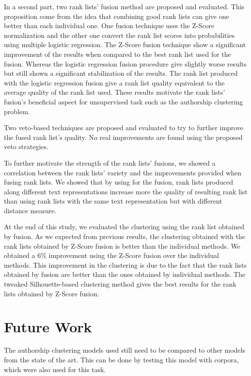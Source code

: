 In a second part, two rank lists' fusion method are proposed and evaluated.
This proposition come from the idea that combining good rank lists can give one better than each individual one.
One fusion technique uses the Z-Score normalization and the other one convert the rank list scores into probabilities using multiple logistic regression.
The Z-Score fusion technique show a significant improvement of the results when compared to the best rank list used for the fusion.
Whereas the logistic regression fusion procedure give slightly worse results but still shown a significant stabilization of the results.
The rank list produced with the logistic regression fusion give a rank list quality equivalent to the average quality of the rank list used.
These results motivate the rank lists' fusion's beneficial aspect for unsupervised task such as the authorship clustering problem.

Two veto-based techniques are proposed and evaluated to try to further improve the fused rank list's quality.
No real improvements are found using the proposed veto strategies.

To further motivate the strength of the rank lists' fusions, we showed a correlation between the rank lists' variety and the improvements provided when fusing rank lists.
We showed that by using for the fusion, rank lists produced along different text representations increase more the quality of resulting rank list than using rank lists with the same text representation but with different distance measure.

At the end of this study, we evaluated the clustering using the rank list obtained by fusion.
As we expected from previous results, the clustering obtained with the rank lists obtained by Z-Score fusion is better than the individual methods.
We obtained a 6\% improvement using the Z-Score fusion over the individual methods.
This improvement in the clustering is due to the fact that the rank lists obtained by fusion are better than the ones obtained by individual methods.
The tweaked Silhouette-based clustering method gives the best results for the rank lists obtained by Z-Score fusion.

\section{Future Work}

The authorship clustering models used still need to be compared to other models from the state of the art.
This can be done by testing this model with corpora, which were also used for this task.

